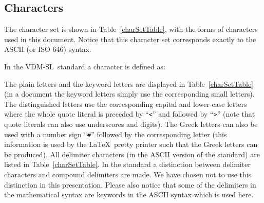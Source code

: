 \documentclass[\pformat,12pt]{article}
\newcommand{\vdmsl}{VDM-SL}
\begin{document}
\subsection{Characters}

The character set is shown in Table~\ref{charSetTable}, with the forms of
characters used in this document. Notice that this character set corresponds
exactly to the ASCII (or ISO 646) syntax.

In the \vdmsl\ standard a character is defined as:


The plain letters and the keyword letters are displayed in
Table~\ref{charSetTable} (in a document the keyword letters simply use the
corresponding small letters). The distinguished letters use the
corresponding capital and lower-case
letters where the whole quote literal is preceded by
``{\tt <}'' and followed by ``{\tt >}'' (note that quote literals
can also use underscores and digits). The Greek letters can also be used
with a number sign ``{\tt \#}'' followed by the corresponding letter (this
information is used by the \LaTeX\ pretty printer such that the Greek letters
can be produced). All delimiter characters (in the ASCII version of the
standard) are listed in Table~\ref{charSetTable}. In the standard a
distinction between delimiter characters and compound delimiters are
made.
We have
chosen not to use this distinction in this presentation. Please also notice
that some of the delimiters in the mathematical syntax are keywords in the
ASCII syntax which is used here.
\end{document}
